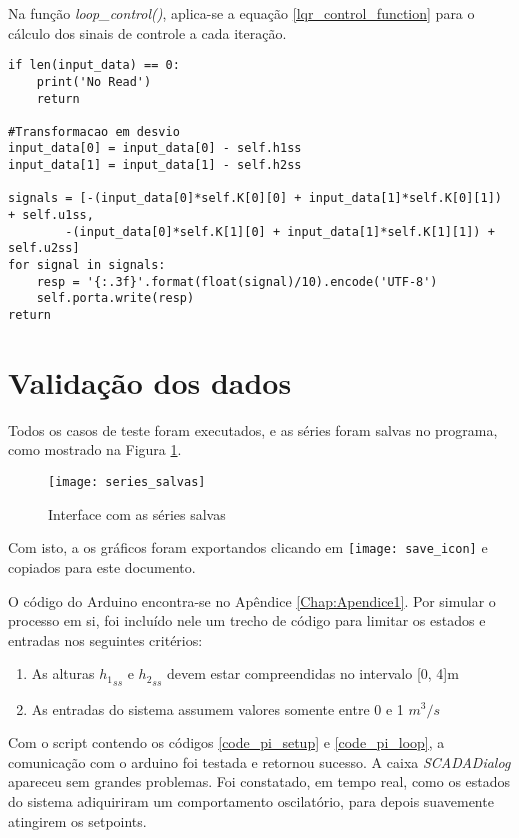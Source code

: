 Na função \emph{loop\_control()}, aplica-se a equação \ref{lqr_control_function} para o cálculo dos sinais de controle a cada iteração.

\begin{code}
\begin{lstlisting}
if len(input_data) == 0:
	print('No Read')
	return

#Transformacao em desvio
input_data[0] = input_data[0] - self.h1ss
input_data[1] = input_data[1] - self.h2ss

signals = [-(input_data[0]*self.K[0][0] + input_data[1]*self.K[0][1]) + self.u1ss,
		-(input_data[0]*self.K[1][0] + input_data[1]*self.K[1][1]) + self.u2ss]
for signal in signals:
	resp = '{:.3f}'.format(float(signal)/10).encode('UTF-8')
	self.porta.write(resp)
return
\end{lstlisting}
\label{code_lqr_loop}
\end{code}

\section{Validação dos dados}

Todos os casos de teste foram executados, e as séries foram salvas no programa, como mostrado na Figura \ref{img_series_salvas}.

\begin{figure}[htb]
	\centering
	\caption{Interface com as séries salvas}
	\texttt{[image: series\_salvas]}
	\label{img_series_salvas}
\end{figure}

Com isto, a os gráficos foram exportandos clicando em \texttt{[image: save\_icon]} e copiados para este documento.

O código do Arduino encontra-se no Apêndice \ref{Chap:Apendice1}. Por simular o processo em si, foi incluído nele um trecho de código para limitar os estados e entradas nos seguintes critérios:

\begin{enumerate}
	\item As alturas ${h_1}_{ss}$ e ${h_2}_{ss}$ devem estar compreendidas no intervalo [0, 4]m
	\item As entradas do sistema assumem valores somente entre 0 e 1 $m^3/s$
\end{enumerate}

Com o script contendo os códigos \ref{code_pi_setup} e \ref{code_pi_loop}, a comunicação com o arduino foi testada e retornou sucesso. A caixa \emph{SCADADialog} apareceu sem grandes problemas. Foi constatado, em tempo real, como os estados do sistema adiquiriram um comportamento oscilatório, para depois suavemente atingirem os setpoints.

